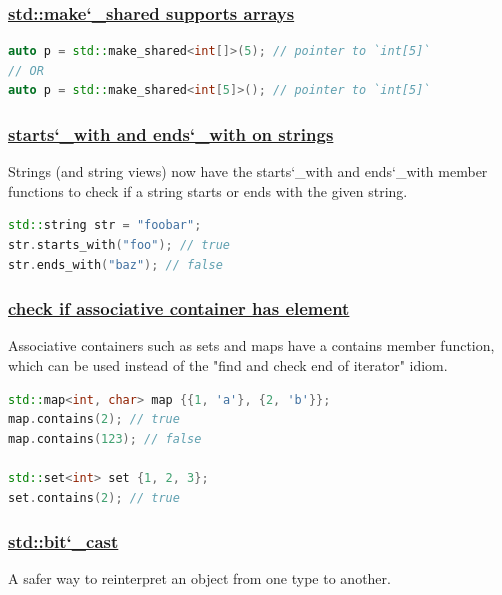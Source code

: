 \subsubsection{\href{https://github.com/AnthonyCalandra/modern-cpp-features/tree/master\#stdmake_shared-supports-arrays}
                    {std::make\char`_shared supports arrays}}


\begin{lstlisting}[language=C++]
auto p = std::make_shared<int[]>(5); // pointer to `int[5]`
// OR
auto p = std::make_shared<int[5]>(); // pointer to `int[5]`
\end{lstlisting}

\subsubsection{\href{https://github.com/AnthonyCalandra/modern-cpp-features/tree/master\#starts_with-and-ends_with-on-strings}
                    {starts\char`_with and ends\char`_with on strings}}
Strings (and string views) now have the starts\char`_with and ends\char`_with member functions to check if a string starts or ends with the given string.

\begin{lstlisting}[language=C++]
std::string str = "foobar";
str.starts_with("foo"); // true
str.ends_with("baz"); // false
\end{lstlisting}

\subsubsection{\href{https://github.com/AnthonyCalandra/modern-cpp-features/tree/master\#check-if-associative-container-has-element}
                    {check if associative container has element}}
Associative containers such as sets and maps have a contains member function, which can be used instead of the "find and check end of iterator" idiom.

\begin{lstlisting}[language=C++]
std::map<int, char> map {{1, 'a'}, {2, 'b'}};
map.contains(2); // true
map.contains(123); // false

std::set<int> set {1, 2, 3};
set.contains(2); // true
\end{lstlisting}

\subsubsection{\href{https://github.com/AnthonyCalandra/modern-cpp-features/tree/master\#stdbit_cast}
                    {std::bit\char`_cast}}
A safer way to reinterpret an object from one type to another.

